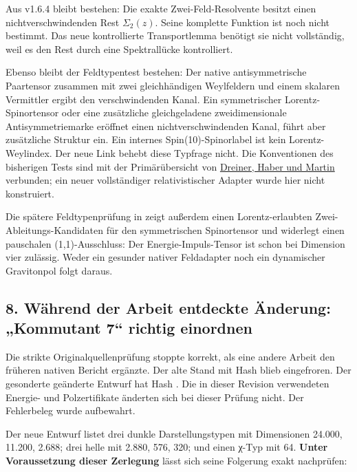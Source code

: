 Aus v1.6.4 bleibt bestehen: Die exakte Zwei-Feld-Resolvente besitzt
einen nichtverschwindenden Rest \(\Sigma_2(z)\). Seine komplette
Funktion ist noch nicht bestimmt. Das neue kontrollierte Transportlemma
benötigt sie nicht vollständig, weil es den Rest durch eine
Spektrallücke kontrolliert.

Ebenso bleibt der Feldtypentest bestehen: Der native antisymmetrische
Paartensor zusammen mit zwei gleichhändigen Weylfeldern und einem
skalaren Vermittler ergibt den verschwindenden Kanal. Ein symmetrischer
Lorentz- Spinortensor oder eine zusätzliche gleichgeladene
zweidimensionale Antisymmetriemarke eröffnet einen nichtverschwindenden
Kanal, führt aber zusätzliche Struktur ein. Ein internes
Spin(10)-Spinorlabel ist kein Lorentz-Weylindex. Der neue Link behebt
diese Typfrage nicht. Die Konventionen des bisherigen Tests sind mit der
Primärübersicht von \href{https://arxiv.org/abs/0812.1594}{Dreiner,
Haber und Martin} verbunden; ein neuer vollständiger relativistischer
Adapter wurde hier nicht konstruiert.

Die spätere Feldtypenprüfung in  zeigt außerdem
einen Lorentz-erlaubten Zwei-Ableitungs-Kandidaten für den symmetrischen
Spinortensor und widerlegt einen pauschalen (1,1)-Ausschluss: Der
Energie-Impuls-Tensor ist schon bei Dimension vier zulässig. Weder ein
gesunder nativer Feldadapter noch ein dynamischer Gravitonpol folgt
daraus.

\subsection{8. Während der Arbeit entdeckte Änderung: „Kommutant 7``
richtig
einordnen}\label{wuxe4hrend-der-arbeit-entdeckte-uxe4nderung-kommutant-7-richtig-einordnen}

Die strikte Originalquellenprüfung stoppte korrekt, als eine andere
Arbeit den früheren nativen Bericht ergänzte. Der alte Stand mit Hash
blieb eingefroren. Der gesonderte geänderte Entwurf hat Hash
.
Die in dieser Revision verwendeten Energie- und Polzertifikate änderten
sich bei dieser Prüfung nicht. Der Fehlerbeleg wurde aufbewahrt.

Der neue Entwurf listet drei dunkle Darstellungstypen mit Dimensionen
24.000, 11.200, 2.688; drei helle mit 2.880, 576, 320; und einen χ-Typ
mit 64. \textbf{Unter Voraussetzung dieser Zerlegung} lässt sich seine
Folgerung exakt nachprüfen:


